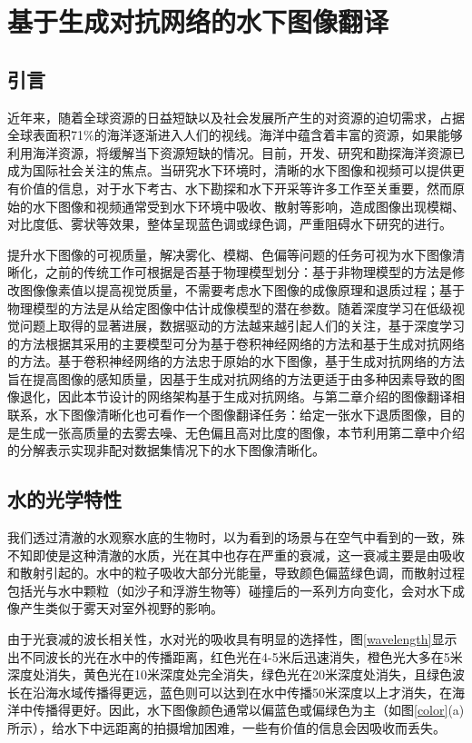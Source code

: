 \chapter{基于生成对抗网络的水下图像翻译}

\section{引言}

近年来，随着全球资源的日益短缺以及社会发展所产生的对资源的迫切需求，占据全球表面积71$\%$的海洋逐渐进入人们的视线。海洋中蕴含着丰富的资源，如果能够利用海洋资源，将缓解当下资源短缺的情况。目前，开发、研究和勘探海洋资源已成为国际社会关注的焦点。当研究水下环境时，清晰的水下图像和视频可以提供更有价值的信息，对于水下考古、水下勘探和水下开采等许多工作至关重要，然而原始的水下图像和视频通常受到水下环境中吸收、散射等影响，造成图像出现模糊、对比度低、雾状等效果，整体呈现蓝色调或绿色调，严重阻碍水下研究的进行。

提升水下图像的可视质量，解决雾化、模糊、色偏等问题的任务可视为水下图像清晰化，之前的传统工作可根据是否基于物理模型划分：基于非物理模型的方法是修改图像像素值以提高视觉质量，不需要考虑水下图像的成像原理和退质过程；基于物理模型的方法是从给定图像中估计成像模型的潜在参数。随着深度学习在低级视觉问题上取得的显著进展，数据驱动的方法越来越引起人们的关注，基于深度学习的方法根据其采用的主要模型可分为基于卷积神经网络的方法和基于生成对抗网络的方法。基于卷积神经网络的方法忠于原始的水下图像，基于生成对抗网络的方法旨在提高图像的感知质量，因基于生成对抗网络的方法更适于由多种因素导致的图像退化，因此本节设计的网络架构基于生成对抗网络。与第二章介绍的图像翻译相联系，水下图像清晰化也可看作一个图像翻译任务：给定一张水下退质图像，目的是生成一张高质量的去雾去噪、无色偏且高对比度的图像，本节利用第二章中介绍的分解表示实现非配对数据集情况下的水下图像清晰化。

\section{水的光学特性}

我们透过清澈的水观察水底的生物时，以为看到的场景与在空气中看到的一致，殊不知即使是这种清澈的水质，光在其中也存在严重的衰减，这一衰减主要是由吸收和散射引起的。水中的粒子吸收大部分光能量，导致颜色偏蓝绿色调，而散射过程包括光与水中颗粒（如沙子和浮游生物等）碰撞后的一系列方向变化，会对水下成像产生类似于雾天对室外视野的影响。

由于光衰减的波长相关性，水对光的吸收具有明显的选择性，图\ref{wavelength}显示出不同波长的光在水中的传播距离，红色光在4-5米后迅速消失，橙色光大多在5米深度处消失，黄色光在10米深度处完全消失，绿色光在20米深度处消失，且绿色波长在沿海水域传播得更远，蓝色则可以达到在水中传播50米深度以上才消失，在海洋中传播得更好。因此，水下图像颜色通常以偏蓝色或偏绿色为主（如图\ref{color}(a)所示），给水下中远距离的拍摄增加困难，一些有价值的信息会因吸收而丢失。

